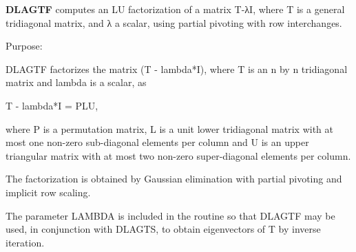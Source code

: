 {\bfseries D\+L\+A\+G\+T\+F} computes an L\+U factorization of a matrix T-\/λ\+I, where T is a general tridiagonal matrix, and λ a scalar, using partial pivoting with row interchanges. 

 \begin{DoxyParagraph}{Purpose\+: }
\begin{DoxyVerb} DLAGTF factorizes the matrix (T - lambda*I), where T is an n by n
 tridiagonal matrix and lambda is a scalar, as

    T - lambda*I = PLU,

 where P is a permutation matrix, L is a unit lower tridiagonal matrix
 with at most one non-zero sub-diagonal elements per column and U is
 an upper triangular matrix with at most two non-zero super-diagonal
 elements per column.

 The factorization is obtained by Gaussian elimination with partial
 pivoting and implicit row scaling.

 The parameter LAMBDA is included in the routine so that DLAGTF may
 be used, in conjunction with DLAGTS, to obtain eigenvectors of T by
 inverse iteration.\end{DoxyVerb}
 
\end{DoxyParagraph}

